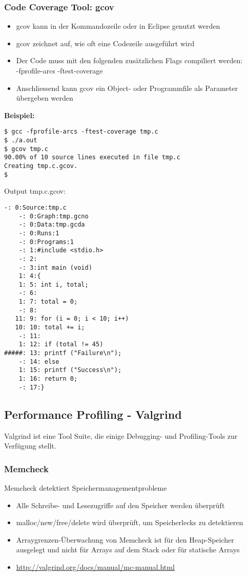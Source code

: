 \subsubsection{Code Coverage Tool: gcov}
\begin{itemize}
    \item gcov kann in der Kommandozeile oder in Eclipse genutzt werden
    \item gcov zeichnet auf, wie oft eine Codezeile ausgeführt wird
    \item Der Code muss mit den folgenden zusätzlichen Flags compiliert werden:\\-fprofile-arcs -ftest-coverage
    \item Anschliessend kann gcov ein Object- oder Programmfile als Parameter übergeben werden
\end{itemize}
\textbf{Beispiel:}
\begin{lstlisting}[style=bash]
$ gcc -fprofile-arcs -ftest-coverage tmp.c
$ ./a.out
$ gcov tmp.c
90.00% of 10 source lines executed in file tmp.c
Creating tmp.c.gcov.
$
\end{lstlisting}
Output tmp.c.gcov:
\begin{lstlisting}[style=bash]
    -: 0:Source:tmp.c
    -: 0:Graph:tmp.gcno
    -: 0:Data:tmp.gcda
    -: 0:Runs:1
    -: 0:Programs:1
    -: 1:#include <stdio.h>
    -: 2:
    -: 3:int main (void)
    1: 4:{
    1: 5: int i, total;
    -: 6:
    1: 7: total = 0;
    -: 8:
   11: 9: for (i = 0; i < 10; i++)
   10: 10: total += i;
    -: 11:
    1: 12: if (total != 45)
#####: 13: printf ("Failure\n");
    -: 14: else
    1: 15: printf ("Success\n");
    1: 16: return 0;
    -: 17:}
\end{lstlisting}

\subsection{Performance Profiling - Valgrind}
Valgrind ist eine Tool Suite, die einige Debugging- und Profiling-Tools zur Verfügung stellt.

\subsubsection{Memcheck}
Memcheck detektiert Speichermanagementprobleme
\begin{itemize}
    \item Alle Schreibe- und Lesezugriffe auf den Speicher werden überprüft
    \item malloc/new/free/delete wird überprüft, um Speicherlecks zu detektieren
    \item Arraygrenzen-Überwachung von Memcheck ist für den Heap-Speicher ausgelegt und nicht für Arrays auf dem Stack oder für statische Arrays
    \item \url{http://valgrind.org/docs/manual/mc-manual.html}
\end{itemize}
